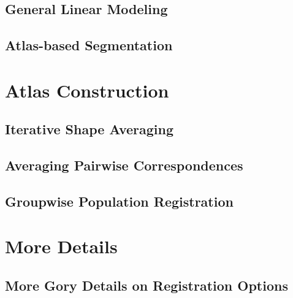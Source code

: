 \documentclass{InsightArticle}
\begin{document}
\subsection{General Linear Modeling}

\subsection{Atlas-based Segmentation}

\section{Atlas Construction}

\subsection{Iterative Shape Averaging}

\cite{RohlBranMaur:2001}
\cite{KuryRohlKrof:2008,BranRohlRyba:2005}

\subsection{Averaging Pairwise Correspondences}

\cite{GuimMeunThir:2000}

\subsection{Groupwise Population Registration}

\cite{Learned-Miller:2006}
\cite{BalcGollShen:2007}
\cite{RohlZahrSull:2008,RohlZahrSull:2010}

\section{More Details}

\subsection{More Gory Details on Registration Options}
\end{document}
